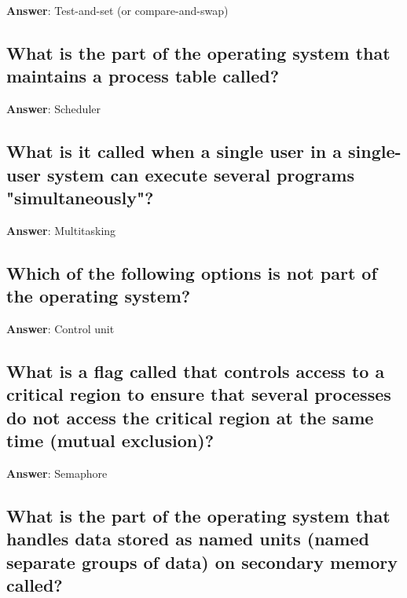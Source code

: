 \documentclass[a4paper,11pt,oneside]{article}
\begin{document}
\begin{sloppypar}
\label{q:7:sa:en:True}

\textbf{Answer}: Test-and-set (or compare-and-swap)



\subsection{What is the part of the operating system that maintains a process table called?}

\label{q:8:sa:en:True}

\textbf{Answer}: Scheduler



\subsection{What is it called when a single user in a single-user system can execute several programs "simultaneously"?}

\label{q:10:sa:en:True}

\textbf{Answer}: Multitasking



\subsection{Which of the following options is not part of the operating system?}

\label{q:11:sa:en:True}

\textbf{Answer}: Control unit



\subsection{What is a flag called that controls access to a critical region to ensure that several processes do not access the critical region at the same time (mutual exclusion)?}

\label{q:12:sa:en:True}

\textbf{Answer}: Semaphore



\subsection{What is the part of the operating system that handles data stored as named units (named separate groups of data) on secondary memory called?}

\label{q:13:sa:en:True}


\end{sloppypar}
\end{document}
